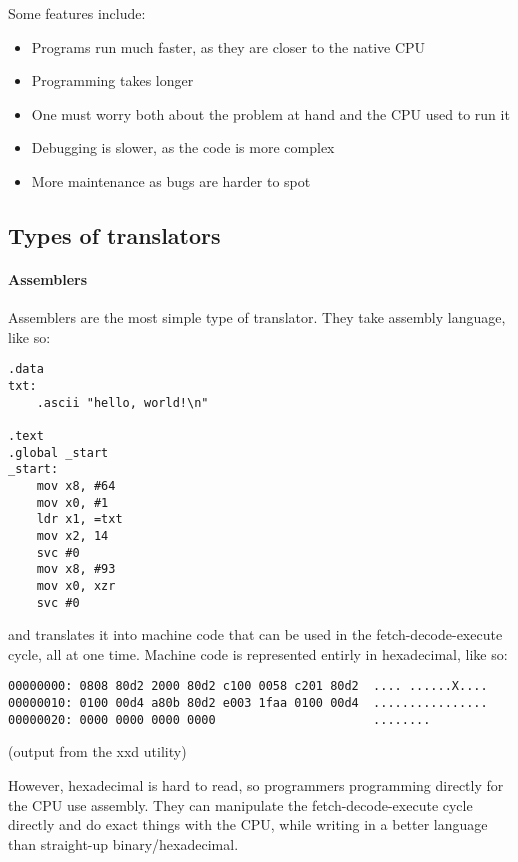 \documentclass[../main.tex]{subfiles}
\begin{document}
Some features include:

\begin{itemize}
    \item Programs run much faster, as they are closer to the native CPU
    \item Programming takes longer
    \item One must worry both about the problem at hand and the CPU used to run it
    \item Debugging is slower, as the code is more complex
    \item More maintenance as bugs are harder to spot
\end{itemize}

\subsection{Types of translators}

\paragraph{Assemblers}

Assemblers are the most simple type of translator. They take assembly language, like so:

\begin{verbatim}
.data
txt:
    .ascii "hello, world!\n"

.text
.global _start
_start:
    mov x8, #64
    mov x0, #1
    ldr x1, =txt
    mov x2, 14
    svc #0
    mov x8, #93
    mov x0, xzr
    svc #0
\end{verbatim}

and translates it into machine code that can be used in the fetch-decode-execute cycle, all at one time. Machine code is represented entirly in hexadecimal, like so:

\begin{verbatim}
00000000: 0808 80d2 2000 80d2 c100 0058 c201 80d2  .... ......X....
00000010: 0100 00d4 a80b 80d2 e003 1faa 0100 00d4  ................
00000020: 0000 0000 0000 0000                      ........
\end{verbatim}

(output from the {\ccmono xxd} utility)

However, hexadecimal is hard to read, so programmers programming directly for the CPU use assembly. They can manipulate the fetch-decode-execute cycle directly and do exact things with the CPU, while writing in a better language than straight-up binary/hexadecimal.
\end{document}
